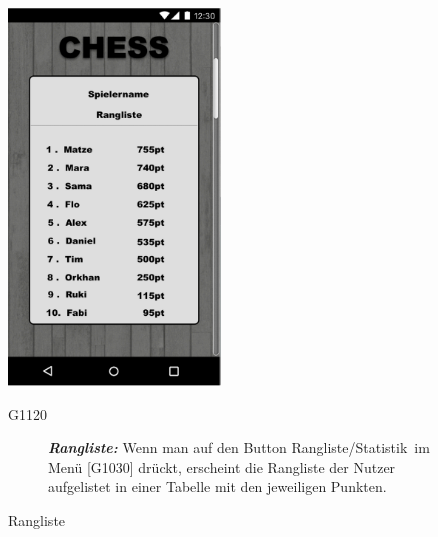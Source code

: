\documentclass[parskip=full]{scrartcl}
\begin{document}
\begin{figure}[htp]
	\begin{minipage}[t]{6cm}
		\vspace{0pt}
		\includegraphics[height=100mm]{leaderboard.png}
		\caption{Rangliste}
		\label{fig:Rangliste}
	\end{minipage}
	\hfill
	\begin{minipage}[t]{6cm}
		\vspace{0pt}
		\begin{description}
			\item[G1120] \textbf{\textit{Rangliste: }} Wenn man auf den Button \glqq Rangliste/Statistik\grqq\ im Menü [G1030] drückt, erscheint die Rangliste der Nutzer aufgelistet in einer Tabelle mit den jeweiligen Punkten.
		\end{description}
	\end{minipage}


\end{figure}
\end{document}
